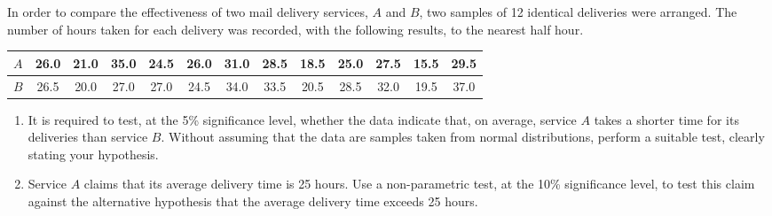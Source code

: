 \begin{problem}
    In order to compare the effectiveness of two mail delivery services, $A$ and $B$, two samples of 12 identical deliveries were arranged. The number of hours taken for each delivery was recorded, with the following results, to the nearest half hour.

    \begin{table}[H]
        \centering
        \begin{tabular}{|c|c|c|c|c|c|c|c|c|c|c|c|c|}
        \hline
        $A$ & 26.0 & 21.0 & 35.0 & 24.5 & 26.0 & 31.0 & 28.5 & 18.5 & 25.0 & 27.5 & 15.5 & 29.5 \\ \hline
        $B$ & 26.5 & 20.0 & 27.0 & 27.0 & 24.5 & 34.0 & 33.5 & 20.5 & 28.5 & 32.0 & 19.5 & 37.0 \\ \hline
        \end{tabular}
    \end{table}

    \begin{enumerate}
        \item It is required to test, at the 5\% significance level, whether the data indicate that, on average, service $A$ takes a shorter time for its deliveries than service $B$. Without assuming that the data are samples taken from normal distributions, perform a suitable test, clearly stating your hypothesis.
        \item Service $A$ claims that its average delivery time is 25 hours. Use a non-parametric test, at the 10\% significance level, to test this claim against the alternative hypothesis that the average delivery time exceeds 25 hours.
    \end{enumerate}
\end{problem}
